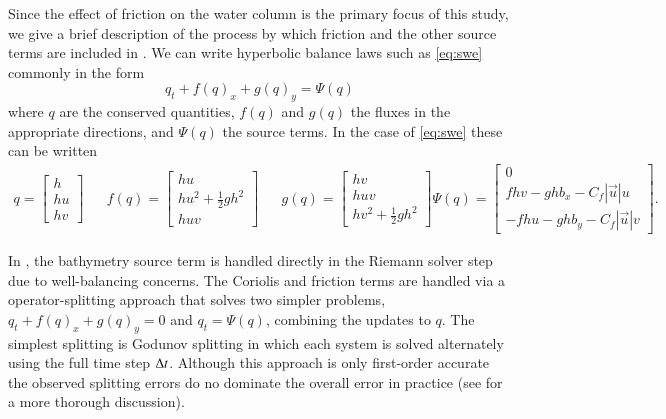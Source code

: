 Since the effect of friction on the water column is the primary focus of this study, we give a brief description of the process by which friction and the other source terms are included in \geoclaw.  We can write hyperbolic balance laws such as \eqref{eq:swe} commonly in the form
\begin{equation}
    q_t + f(q)_x + g(q)_y = \Psi(q)
\end{equation}
where $q$ are the conserved quantities, $f(q)$ and $g(q)$ the fluxes in the appropriate directions, and $\Psi(q)$ the source terms.  In the case of \eqref{eq:swe} these can be written
\begin{align}
    q = \begin{bmatrix}
        h \\ hu \\ hv
    \end{bmatrix} & &
    f(q) = \begin{bmatrix}
        hu \\ hu^2 + \frac{1}{2} gh^2 \\ huv
    \end{bmatrix} & &
    g(q) = \begin{bmatrix}
        hv \\ huv \\ hv^2 + \frac{1}{2} gh^2
    \end{bmatrix}
    \Psi(q) = \begin{bmatrix}
        0 \\ fhv - ghb_x - C_f |\vec{u}| u \\ -fhu - ghb_y - C_f |\vec{u}| v
    \end{bmatrix}.
\end{align}

In \geoclaw, the bathymetry source term is handled directly in the Riemann solver step due to well-balancing concerns.  The Coriolis and friction terms are handled via a operator-splitting approach that solves two simpler problems, $q_t + f(q)_x + g(q)_y = 0$ and $q_t = \Psi(q)$, combining the updates to $q$.  The simplest splitting is Godunov splitting in which each system is solved alternately using the full time step $\Delta t$.  Although this approach is only first-order accurate the observed splitting errors do no dominate the overall error in practice (see \cite{LevequeBook2002} for a more thorough discussion).

